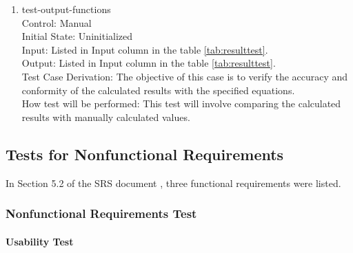 \documentclass[12pt, titlepage]{article}
\begin{document}
\begin{enumerate}

    \item test-output-functions \\
    Control: Manual	\\				
    Initial State: Uninitialized\\		
    Input: Listed in Input column in the table \ref{tab:resulttest}.\\			
    Output: Listed in Input column in the table \ref{tab:resulttest}.\\
    Test Case Derivation: The objective of this case is to verify the accuracy and conformity of the calculated results with the specified equations.\\
    How test will be performed: This test will involve comparing the calculated results with manually calculated values.\\
					
\end{enumerate}
\subsection{Tests for Nonfunctional Requirements}

In Section 5.2 of the SRS document \cite{srs}, three functional requirements were listed.

\subsubsection{Nonfunctional Requirements Test}
		
\paragraph{Usability Test}
\end{document}
